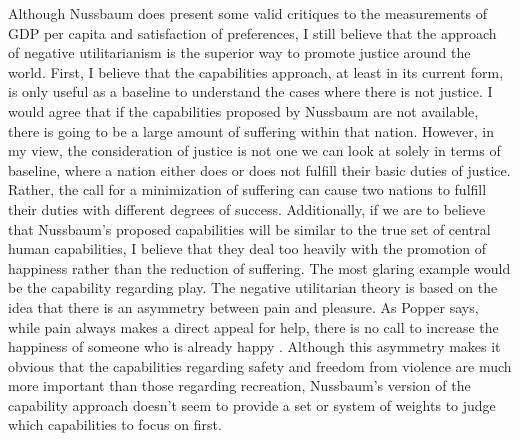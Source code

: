 \documentclass[12pt]{article}
\begin{document}
Although Nussbaum does present some valid critiques to the measurements of GDP per capita and satisfaction of preferences, I still believe that the approach of negative utilitarianism is the superior way to promote justice around the world.
First, I believe that the capabilities approach, at least in its current form, is only useful as a baseline to understand the cases where there is not justice.
I would agree that if the capabilities proposed by Nussbaum are not available, there is going to be a large amount of suffering within that nation.
However, in my view, the consideration of justice is not one we can look at solely in terms of baseline, where a nation either does or does not fulfill their basic duties of justice.
Rather, the call for a minimization of suffering can cause two nations to fulfill their duties with different degrees of success.
Additionally, if we are to believe that Nussbaum's proposed capabilities will be similar to the true set of central human capabilities, I believe that they deal too heavily with the promotion of happiness rather than the reduction of suffering.
The most glaring example would be the capability regarding play.
The negative utilitarian theory is based on the idea that there is an asymmetry between pain and pleasure.
As Popper says, while pain always makes a direct appeal for help, there is no call to increase the happiness of someone who is already happy \autocite[284]{popper2002}.
Although this asymmetry makes it obvious that the capabilities regarding safety and freedom from violence are much more important than those regarding recreation, Nussbaum's version of the capability approach doesn't seem to provide a set or system of weights to judge which capabilities to focus on first.
\end{document}
